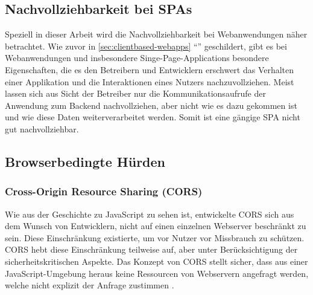 \subsection{Nachvollziehbarkeit bei SPAs}
\label{sec:nachvollziehbarkeit-bei-spas}

Speziell in dieser Arbeit wird die Nachvollziehbarkeit bei Webanwendungen näher betrachtet. Wie zuvor in \autoref{sec:clientbased-webapps} \enquote{} geschildert, gibt es bei Webanwendungen und insbesondere Singe-Page-Applications besondere Eigenschaften, die es den Betreibern und Entwicklern erschwert das Verhalten einer Applikation und die Interaktionen eines Nutzers nachzuvollziehen. Meist lassen sich aus Sicht der Betreiber nur die Kommunikationsaufrufe der Anwendung zum Backend nachvollziehen, aber nicht wie es dazu gekommen ist und wie diese Daten weiterverarbeitet werden. Somit ist eine gängige SPA nicht gut nachvollziehbar.
	


\subsection{Browserbedingte Hürden}


\subsubsection{Cross-Origin Resource Sharing (CORS)}

Wie aus der Geschichte zu JavaScript zu sehen ist, entwickelte CORS sich aus dem Wunsch von Entwicklern, nicht auf einen einzelnen Webserver beschränkt zu sein. Diese Einschränkung existierte, um vor Nutzer vor Missbrauch zu schützen. CORS hebt diese Einschränkung teilweise auf, aber unter Berücksichtigung der sicherheitskritischen Aspekte. Das Konzept von CORS stellt sicher, dass aus einer JavaScript-Umgebung heraus keine Ressourcen von Webservern angefragt werden, welche nicht explizit der Anfrage zustimmen \cite{MDNCORS}.

